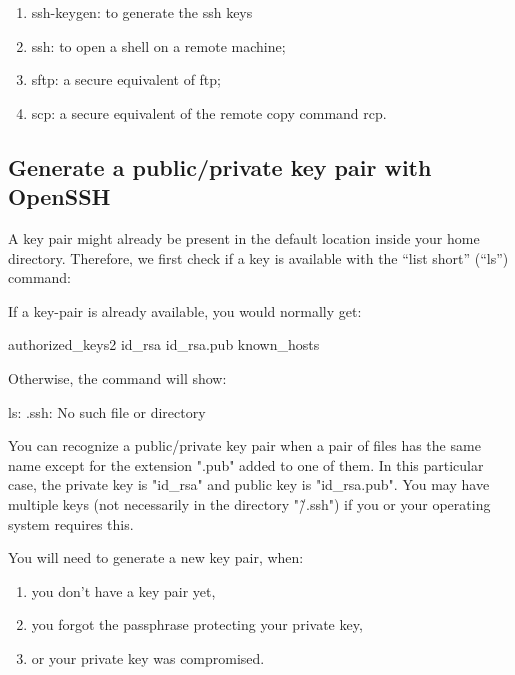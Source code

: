   \begin{enumerate}
    \item  ssh-keygen: to generate the ssh keys
    \item  ssh: to open a shell on a remote machine;
    \item  sftp: a secure equivalent of ftp;
    \item  scp: a secure equivalent of the remote copy command rcp.
  \end{enumerate}

  \subsection{Generate a public/private key pair with OpenSSH}
  \label{sec:generate-key-pair-with-openssh}

  A key pair might already be present in the default location inside your home
  directory. Therefore, we first check if a key is available with the ``list
  short'' (``ls'')  command:

  \begin{prompt}
  $ %
  \end{prompt}


  If a key-pair is already available, you would normally get:
  \begin{prompt}
  authorized\_keys2    id\_rsa            id\_rsa.pub         known\_hosts
  \end{prompt}

  Otherwise, the command will show:

  \begin{prompt}
  ls: .ssh: No such file or directory
  \end{prompt}

  You can recognize a public/private key pair when a pair of files has the same
  name except for the extension ".pub" added to one of them. In this particular
  case, the private key is "id\_rsa" and public key is "id\_rsa.pub". You may
  have multiple keys (not necessarily in the directory "\~/.ssh") if you or
  your operating system requires this.

  You will need to generate a new key pair, when:
  \begin{enumerate}
    \item  you don't have a key pair yet,
    \item  you forgot the passphrase protecting your private key,
    \item  or your private key was compromised.
  \end{enumerate}

